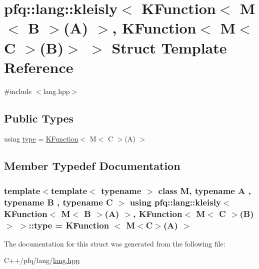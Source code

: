 \hypertarget{structpfq_1_1lang_1_1kleisly_3_01KFunction_3_01M_3_01B_01_4_07A_08_01_4_00_01KFunction_3_01M_3_01C_01_4_07B_08_4_01_4}{}\section{pfq\+:\+:lang\+:\+:kleisly$<$ K\+Function$<$ M$<$ B $>$(A) $>$, K\+Function$<$ M$<$ C $>$(B)$>$ $>$ Struct Template Reference}
\label{structpfq_1_1lang_1_1kleisly_3_01KFunction_3_01M_3_01B_01_4_07A_08_01_4_00_01KFunction_3_01M_3_01C_01_4_07B_08_4_01_4}


{\ttfamily \#include $<$lang.\+hpp$>$}

\subsection*{Public Types}
\begin{DoxyCompactItemize}
\item 
using \hyperlink{structpfq_1_1lang_1_1kleisly_3_01KFunction_3_01M_3_01B_01_4_07A_08_01_4_00_01KFunction_3_01M_3_01C_01_4_07B_08_4_01_4_a733eac3b86940e76816571e91cf26ea3}{type} = \hyperlink{structpfq_1_1lang_1_1KFunction}{K\+Function}$<$ M$<$ C $>$(A) $>$
\end{DoxyCompactItemize}


\subsection{Member Typedef Documentation}
\subsubsection[{\texorpdfstring{type}{type}}]{\setlength{\rightskip}{0pt plus 5cm}template$<$template$<$ typename $>$ class M, typename A , typename B , typename C $>$ using {\bf pfq\+::lang\+::kleisly}$<$ {\bf K\+Function}$<$ M$<$ B $>$(A) $>$, {\bf K\+Function}$<$ M$<$ C $>$(B)$>$ $>$\+::{\bf type} =  {\bf K\+Function} $<$ M$<$C$>$(A) $>$}\hypertarget{structpfq_1_1lang_1_1kleisly_3_01KFunction_3_01M_3_01B_01_4_07A_08_01_4_00_01KFunction_3_01M_3_01C_01_4_07B_08_4_01_4_a733eac3b86940e76816571e91cf26ea3}{}\label{structpfq_1_1lang_1_1kleisly_3_01KFunction_3_01M_3_01B_01_4_07A_08_01_4_00_01KFunction_3_01M_3_01C_01_4_07B_08_4_01_4_a733eac3b86940e76816571e91cf26ea3}


The documentation for this struct was generated from the following file\+:\begin{DoxyCompactItemize}
\item 
C++/pfq/lang/\hyperlink{lang_8hpp}{lang.\+hpp}\end{DoxyCompactItemize}
